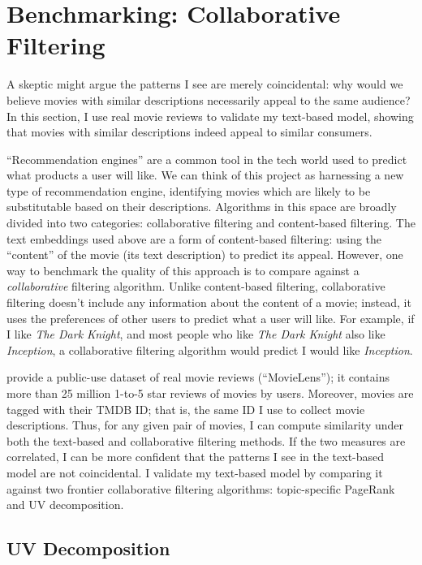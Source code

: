 \documentclass{article}
\begin{document}

\section{Benchmarking: Collaborative Filtering}

A skeptic might argue the patterns I see are merely coincidental: why would we believe movies with similar descriptions necessarily appeal to the same audience? In this section, I use real movie reviews to validate my text-based model, showing that movies with similar descriptions indeed appeal to similar consumers.

``Recommendation engines'' are a common tool in the tech world used to predict what products a user will like. We can think of this project as harnessing a new type of recommendation engine, identifying movies which are likely to be substitutable based on their descriptions. Algorithms in this space are broadly divided into two categories: collaborative filtering and content-based filtering. The text embeddings used above are a form of content-based filtering: using the ``content'' of the movie (its text description) to predict its appeal. However, one way to benchmark the quality of this approach is to compare against a \emph{collaborative} filtering algorithm. Unlike content-based filtering, collaborative filtering doesn't include any information about the content of a movie; instead, it uses the preferences of other users to predict what a user will like. For example, if I like \emph{The Dark Knight}, and most people who like \emph{The Dark Knight} also like \emph{Inception}, a collaborative filtering algorithm would predict I would like \emph{Inception}. 

\textcite{harper2016ATIIS} provide a public-use dataset of real movie reviews (``MovieLens''); it contains more than 25 million 1-to-5 star reviews of movies by users. Moreover, movies are tagged with their TMDB ID; that is, the same ID I use to collect movie descriptions. Thus, for any given pair of movies, I can compute similarity under both the text-based and collaborative filtering methods. If the two measures are correlated, I can be more confident that the patterns I see in the text-based model are not coincidental. I validate my text-based model by comparing it against two frontier collaborative filtering algorithms: topic-specific PageRank and UV decomposition.

\pagebreak

\subsection{UV Decomposition}
\end{document}
